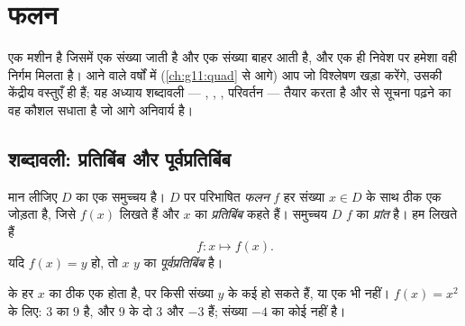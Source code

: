 \chapter{फलन}\label{ch:g10:functions}

 एक मशीन है जिसमें एक संख्या जाती है और एक संख्या बाहर आती है, और एक ही
निवेश पर हमेशा वही निर्गम मिलता है। आने वाले वर्षों में (\cref{ch:g11:quad} से आगे) आप जो
विश्लेषण खड़ा करेंगे, उसकी केंद्रीय वस्तुएँ  ही हैं; यह अध्याय शब्दावली
--- , , , परिवर्तन --- तैयार करता है और  से सूचना
पढ़ने का वह कौशल सधाता है जो आगे अनिवार्य है।

\section{शब्दावली: प्रतिबिंब और पूर्वप्रतिबिंब}

\begin{definition}[फलन]\label{def:g10:functions:function}
मान लीजिए $D$  का एक समुच्चय है। $D$ पर परिभाषित
\emph{फलन} $f$ हर संख्या $x \in D$ के साथ ठीक एक 
जोड़ता है, जिसे $f(x)$ लिखते हैं और $x$ का \emph{प्रतिबिंब}
कहते हैं। समुच्चय $D$ $f$ का \emph{प्रांत} है। हम लिखते हैं
\[
f : x \longmapsto f(x).
\]
यदि $f(x) = y$ हो, तो $x$ $y$ का \emph{पूर्वप्रतिबिंब}
है।
\end{definition}

\begin{remark}
 के हर $x$ का ठीक एक  होता है, पर किसी संख्या $y$ के कई
 हो सकते हैं, या एक भी नहीं। $f(x) = x^2$ के लिए: $3$ का 
$9$ है, और $9$ के दो  $3$ और $-3$ हैं; संख्या $-4$ का कोई
 नहीं है।
\end{remark}

